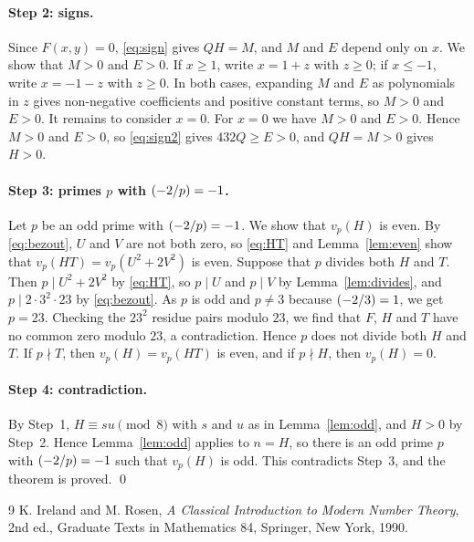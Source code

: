 \documentclass[11pt]{article}
\newcommand{\leg}[2]{\mathchoice{\biggl(\dfrac{#1}{#2}\biggr)}{(#1/#2)}{(#1/#2)}{(#1/#2)}}
\begin{document}
\paragraph{Step 2: signs.} Since $F(x,y)=0$, \eqref{eq:sign} gives $QH=M$, and $M$ and $E$ depend only on $x$. We show that $M>0$ and $E>0$. If $x\geq1$, write $x=1+z$ with $z\geq0$; if $x\leq-1$, write $x=-1-z$ with $z\geq0$. In both cases, expanding $M$ and $E$ as polynomials in $z$ gives non-negative coefficients and positive constant terms, so $M>0$ and $E>0$. It remains to consider $x=0$. For $x=0$ we have $M>0$ and $E>0$. Hence $M>0$ and $E>0$, so \eqref{eq:sign2} gives $432Q\geq E>0$, and $QH=M>0$ gives $H>0$.

\paragraph{\texorpdfstring{Step 3: primes $p$ with $\leg{-2}{p}=-1$.}{Step 3: inert primes.}} Let $p$ be an odd prime with $\leg{-2}{p}=-1$. We show that $v_p(H)$ is even. By \eqref{eq:bezout}, $U$ and $V$ are not both zero, so \eqref{eq:HT} and Lemma~\ref{lem:even} show that $v_p(HT)=v_p(U^2+2V^2)$ is even. Suppose that $p$ divides both $H$ and $T$. Then $p\mid U^2+2V^2$ by \eqref{eq:HT}, so $p\mid U$ and $p\mid V$ by Lemma~\ref{lem:divides}, and $p\mid 2\cdot 3^{2}\cdot 23$ by \eqref{eq:bezout}. As $p$ is odd and $p\neq3$ because $\leg{-2}{3}=1$, we get $p=23$. Checking the $23^2$ residue pairs modulo $23$, we find that $F$, $H$ and $T$ have no common zero modulo $23$, a contradiction. Hence $p$ does not divide both $H$ and $T$. If $p\nmid T$, then $v_p(H)=v_p(HT)$ is even, and if $p\nmid H$, then $v_p(H)=0$.

\paragraph{Step 4: contradiction.} By Step~1, $H\equiv su\pmod{8}$ with $s$ and $u$ as in Lemma~\ref{lem:odd}, and $H>0$ by Step~2. Hence Lemma~\ref{lem:odd} applies to $n=H$, so there is an odd prime $p$ with $\leg{-2}{p}=-1$ such that $v_p(H)$ is odd. This contradicts Step~3, and the theorem is proved.
\qed

\begin{thebibliography}{9}
 K. Ireland and M. Rosen, \emph{A Classical Introduction to Modern Number Theory}, 2nd ed., Graduate Texts in Mathematics 84, Springer, New York, 1990.
\end{thebibliography}
\end{document}
